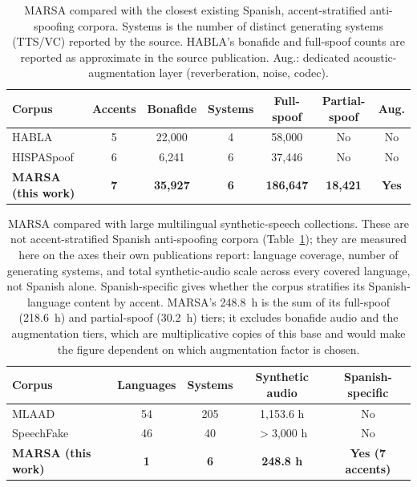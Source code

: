 \documentclass[11pt]{report}
\begin{document}
\begin{table}[H]
\centering
\caption{MARSA compared with the closest existing Spanish, accent-stratified
anti-spoofing corpora. Systems is the number of distinct generating
systems (TTS/VC) reported by the source. HABLA's bonafide and
full-spoof counts are reported as approximate in the source
publication. Aug.: dedicated acoustic-augmentation layer
(reverberation, noise, codec).}
\label{tab:corpuscompare}
\small
\begin{tabular}{lcccccc}
\toprule
\textbf{Corpus} & \textbf{Accents} & \textbf{Bonafide} & \textbf{Systems} & \textbf{Full-spoof} & \textbf{Partial-spoof} & \textbf{Aug.} \\
\midrule
HABLA \citep{habla}      & 5 & 22{,}000 & 4 & 58{,}000 & No & No \\
HISPASpoof \citep{hispaspoof} & 6 & 6{,}241  & 6 & 37{,}446 & No & No \\
\textbf{MARSA (this work)} & \textbf{7} & \textbf{35{,}927} & \textbf{6} & \textbf{186{,}647} & \textbf{18{,}421} & \textbf{Yes} \\
\bottomrule
\end{tabular}
\end{table}

\begin{table}[H]
\centering
\caption{MARSA compared with large multilingual synthetic-speech
collections. These are not accent-stratified Spanish anti-spoofing
corpora (Table~\ref{tab:corpuscompare}); they are measured here on the
axes their own publications report: language coverage, number of
generating systems, and total synthetic-audio scale across every
covered language, not Spanish alone. Spanish-specific gives whether
the corpus stratifies its Spanish-language content by accent. MARSA's
248.8~h is the sum of its full-spoof (218.6~h) and partial-spoof
(30.2~h) tiers; it excludes bonafide audio and the augmentation tiers,
which are multiplicative copies of this base and would make the figure
dependent on which augmentation factor is chosen.}
\label{tab:multilingualcompare}
\small
\begin{tabular}{lcccc}
\toprule
\textbf{Corpus} & \textbf{Languages} & \textbf{Systems} & \textbf{Synthetic audio} & \textbf{Spanish-specific} \\
\midrule
MLAAD \citep{mlaad}           & 54 & 205 & 1{,}153.6 h        & No \\
SpeechFake \citep{speechfake} & 46 & 40  & $>$3{,}000 h       & No \\
\textbf{MARSA (this work)}    & \textbf{1} & \textbf{6} & \textbf{248.8 h} & \textbf{Yes (7 accents)} \\
\bottomrule
\end{tabular}
\end{table}
\end{document}
